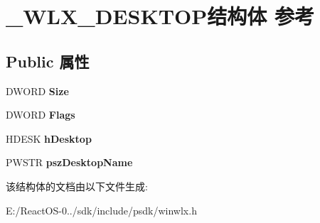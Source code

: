 \hypertarget{struct___w_l_x___d_e_s_k_t_o_p}{}\section{\+\_\+\+W\+L\+X\+\_\+\+D\+E\+S\+K\+T\+O\+P结构体 参考}
\label{struct___w_l_x___d_e_s_k_t_o_p}
\subsection*{Public 属性}
\begin{DoxyCompactItemize}
\item 
\mbox{\label{struct___w_l_x___d_e_s_k_t_o_p_a9787f7aa5c7a61eccff6c7d88007df0c}} 
D\+W\+O\+RD {\bfseries Size}
\item 
\mbox{\label{struct___w_l_x___d_e_s_k_t_o_p_ac2058974ea118bd3f7601638843e21bf}} 
D\+W\+O\+RD {\bfseries Flags}
\item 
\mbox{\label{struct___w_l_x___d_e_s_k_t_o_p_a4aee375ae14abd90006addb87baa7621}} 
H\+D\+E\+SK {\bfseries h\+Desktop}
\item 
\mbox{\label{struct___w_l_x___d_e_s_k_t_o_p_a2238ea720a319ed7399c5ef2cba50f59}} 
P\+W\+S\+TR {\bfseries psz\+Desktop\+Name}
\end{DoxyCompactItemize}


该结构体的文档由以下文件生成\+:\begin{DoxyCompactItemize}
\item 
E\+:/\+React\+O\+S-\/0../sdk/include/psdk/winwlx.\+h\end{DoxyCompactItemize}
